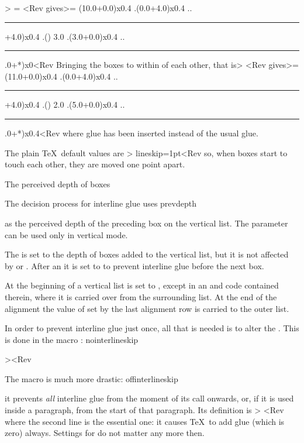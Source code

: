 \examples\Ver>
\baselineskip=10pt \lineskiplimit=2pt \lineskip=2pt
=\vbox{\hbox{\vrule depth4pt}
               \hbox{\vrule height 3pt}}
<Rev gives\Ver>=
\vbox(10.0+0.0)x0.4
.\hbox(0.0+4.0)x0.4
..\rule(*+4.0)x0.4
.\glue(\baselineskip) 3.0
.\hbox(3.0+0.0)x0.4
..\rule(3.0+*)x0<Rev Bringing the boxes to within  
of each other, that is\Ver>
\vbox{\hbox{\vrule depth4pt}
              \hbox{\vrule height 5pt}}
<Rev gives\Ver>=
\vbox(11.0+0.0)x0.4
.\hbox(0.0+4.0)x0.4
..\rule(*+4.0)x0.4
.\glue(\lineskip) 2.0
.\hbox(5.0+0.0)x0.4
..\rule(5.0+*)x0.4<Rev where  glue has been inserted
instead of the usual  glue.
\>

The plain \TeX\ default values are
\Ver>\lineskiplimit=0pt lineskip=1pt<Rev
so, when boxes start to touch each other, they are
moved one point apart.

\point The perceived depth of boxes

The decision process for interline glue uses 
\csterm prevdepth\par
as the perceived depth of the preceding box on the vertical
list. The  parameter can be used only in
vertical mode.

The  is set to the depth of boxes added to the
vertical list, but it is not affected by 
or . After an  it is set to
\n{-1000pt} to prevent interline glue before the next box.

At the beginning of a vertical list 
is set to \n{-1000pt}, except in an 
and  code contained therein, where it
is carried over from the surrounding list.
At the end of the alignment the value of 
set by the last alignment row is carried to the outer list.

In order to prevent interline glue just once, all that
is needed is to alter the .
This is done in the macro :
\csterm nointerlineskip\par
\Ver>\def\nointerlineskip{\prevdepth=-1000pt}<Rev

The  macro is much more drastic:
\csterm offinterlineskip\par
it prevents {\sl all\/} interline glue from the moment
of its call onwards, or, if it is used inside a paragraph,
from the start of that paragraph.
Its definition is
\Ver>\baselineskip=-1000pt \lineskip=0pt 
\lineskiplimit\maxdimen<Rev
where the second line is the essential one: it
causes \TeX\ to add  glue (which is zero)
always. 
Settings for  do not matter any more then.

